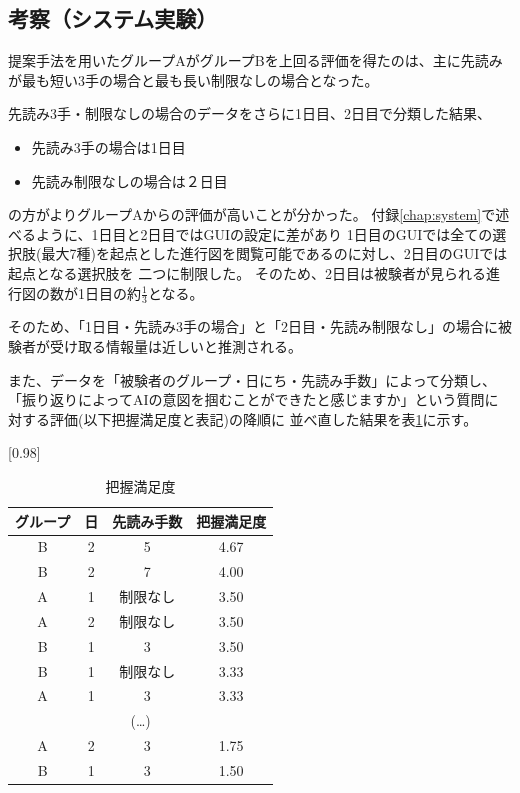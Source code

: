 \subsection{考察（システム実験）}


提案手法を用いたグループAがグループBを上回る評価を得たのは、主に先読みが最も短い3手の場合と最も長い制限なしの場合となった。

先読み3手・制限なしの場合のデータをさらに1日目、2日目で分類した結果、
\begin{itemize}
    \item 先読み3手の場合は1日目
    \item 先読み制限なしの場合は２日目
\end{itemize}

の方がよりグループAからの評価が高いことが分かった。
付録\ref{chap:system}で述べるように、1日目と2日目ではGUIの設定に差があり
1日目のGUIでは全ての選択肢(最大7種)を起点とした進行図を閲覧可能であるのに対し、2日目のGUIでは起点となる選択肢を
二つに制限した。
そのため、2日目は被験者が見られる進行図の数が1日目の約$\frac{1}{3}$となる。

そのため、「1日目・先読み3手の場合」と「2日目・先読み制限なし」の場合に被験者が受け取る情報量は近しいと推測される。

また、データを「被験者のグループ・日にち・先読み手数」によって分類し、「振り返りによってAIの意図を掴むことができたと感じますか」という質問に対する評価(以下把握満足度と表記)の降順に
並べ直した結果を表\ref{table:order}に示す。
\begin{table}[H]
	\caption{把握満足度}
    \label{table:order}
    \scriptsize
	\centering
	\scalebox{0.98}[0.98]{
		\begin{tabular}{c|c|c||c}
			グループ& 日 & 先読み手数 &把握満足度 \\ \hline
			B & 2 & 5 & 4.67\\
            B & 2 & 7 & 4.00\\
            A & 1 & 制限なし& 3.50\\
            A & 2 & 制限なし& 3.50\\
            B & 1 & 3& 3.50\\
            B & 1 & 制限なし& 3.33\\
            A & 1 & 3& 3.33\\
            \multicolumn{4}{c}{(\ldots)}\\
            A & 2 & 3 & 1.75\\
            B & 1 & 3 & 1.50\\

		\end{tabular}
	}
	
\end{table}


